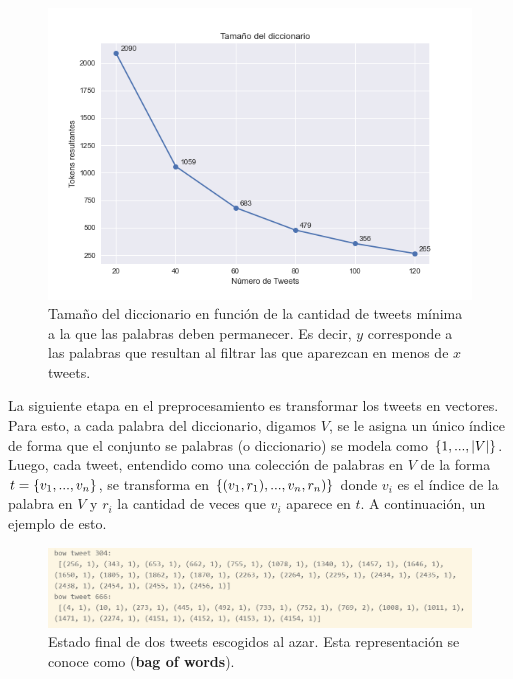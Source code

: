 \documentclass{article}
\begin{document}
	\begin{figure}[H]
		\centering
		\includegraphics[scale=.5]{../imgs/no_below_len_dict.png}
		\caption{Tamaño del diccionario en función de la cantidad de tweets mínima a la que las palabras deben permanecer. Es decir, $y$ corresponde a las palabras que resultan al filtrar las que aparezcan en menos de $x$ tweets.}
	\end{figure}

	

	La siguiente etapa en el preprocesamiento es transformar los tweets en vectores. Para esto, a cada palabra del diccionario, digamos $V$, se le asigna un único índice de forma que el conjunto se palabras (o diccionario) se modela como $\left\{1,...,|V|\right\}$. Luego, cada tweet, entendido como una colección de palabras en $V$ de la forma $t=\left\{v_1,...,v_n\right\}$, se transforma en $\left\{(v_1,r_1),...,v_n,r_n)\right\}$ donde $v_i$ es el índice de la palabra en $V$ y $r_i$ la cantidad de veces que $v_i$ aparece en $t$. A continuación, un ejemplo de esto.
	
	\begin{figure}[H]
		\centering
		\includegraphics[scale=.5]{../imgs/bow_tweet_informe.png}
		\caption{Estado final de dos tweets escogidos al azar. Esta representación se conoce como  (\textbf{bag of words}).}
		\label{fig: bow_example}
	\end{figure}
	
\end{document}
